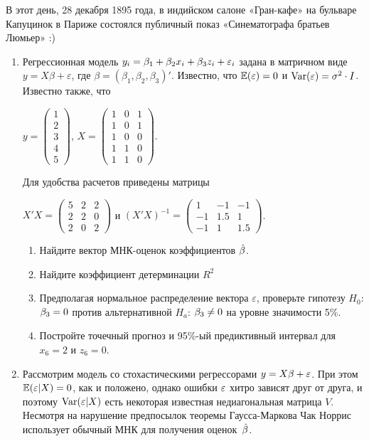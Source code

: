 \documentclass[12pt, a4paper]{article}\usepackage[]{graphicx}\usepackage[]{color}
\begin{document}
В этот день, 28 декабря 1895 года, в индийском салоне «Гран-кафе» на бульваре Капуцинок в Париже состоялся публичный показ «Синематографа братьев Люмьер» :)

\begin{enumerate}
\item Регрессионная модель $y_i=\beta_1 + \beta_2 x_i + \beta_3 z_i + \varepsilon_i$  задана в матричном виде  $y=X\beta+\varepsilon$, где $\beta=(\beta_1,\beta_2,\beta_3)'$.
Известно, что $\mathbb{E}(\varepsilon)=0$  и  $\operatorname{Var}(\varepsilon)=\sigma^2\cdot I$.
Известно также, что

$y=\left(
\begin{array}{c}
1\\
2\\
3\\
4\\
5
\end{array}\right)$,
$X=\left(\begin{array}{ccc}
1 & 0 & 1 \\
1 & 0 & 1 \\
1 & 0 & 0 \\
1 & 1 & 0 \\
1 & 1 & 0
\end{array}\right)$.


Для удобства расчетов приведены матрицы


$X'X=\left(
\begin{array}{ccc}
5 & 2 & 2\\
2 & 2 & 0\\
2 & 0 & 2
\end{array}\right)$ и $(X'X)^{-1}=\left(
\begin{array}{ccc}
1 & -1 & -1 \\
-1 & 1.5 & 1 \\
-1 & 1 & 1.5
\end{array}\right)$.

\begin{enumerate}
\item Найдите вектор МНК-оценок коэффициентов $\hat{\beta}$.
\item Найдите коэффициент детерминации $R^2$
\item Предполагая нормальное распределение вектора $\varepsilon$, проверьте гипотезу $H_0$: $\beta_3=0$ против альтернативной $H_a$: $\beta_3\neq 0$ на уровне значимости 5\%.
\item Постройте точечный прогноз и 95\%-ый предиктивный интервал для $x_6=2$ и $z_6=0$.
\end{enumerate}


\item Рассмотрим модель со стохастическими регрессорами $y=X\beta + \varepsilon$. При этом $\mathbb{E}(\varepsilon|X)=0$, как и положено, однако ошибки $\varepsilon$ хитро зависят друг от друга, и поэтому $\operatorname{Var}(\varepsilon|X)$ есть некоторая известная недиагональная матрица $V$. Несмотря на нарушение предпосылок теоремы Гаусса-Маркова Чак Норрис использует обычный МНК для получения оценок~$\hat{\beta}$.


\end{enumerate}
\end{document}

